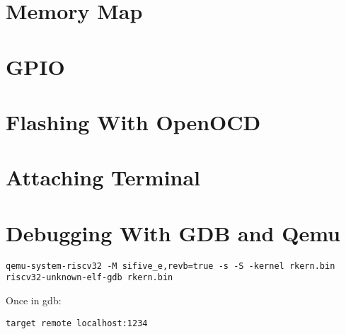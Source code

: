 \documentclass[a4paper,12pt,twoside]{report}
\begin{document}
        \section{Memory Map}
           	

        \section{GPIO}
            

        \section{Flashing With OpenOCD}
            

        \section{Attaching Terminal}
            

        \section{Debugging With GDB and Qemu}
\begin{lstlisting}
qemu-system-riscv32 -M sifive_e,revb=true -s -S -kernel rkern.bin
riscv32-unknown-elf-gdb rkern.bin
\end{lstlisting}

Once in gdb:
\begin{lstlisting}
target remote localhost:1234
\end{lstlisting}

    \printbibliography
\end{document}
